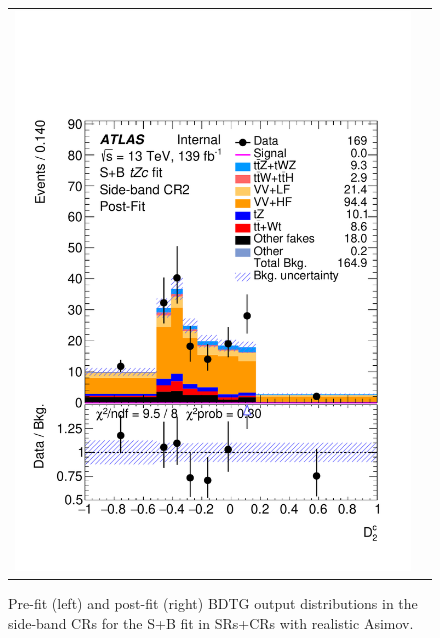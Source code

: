 \begin{figure}[htbp]
\begin{tabular}{cc}
		\includegraphics[width=.45\textwidth]{Chapters/CH8/figures/SPLUSB_CRSR_UsingDL1rcFullSys/Plots/SBCR2_postFit} \\
	\end{tabular}
	\caption{Pre-fit (left) and post-fit (right) BDTG output distributions in the side-band CRs for the S+B \tZc fit in SRs+CRs with realistic Asimov.
		\ErrStatSys
	}%
	\label{fig:stat:tzc:splusb:crsr:crplots:1}
\end{figure}

